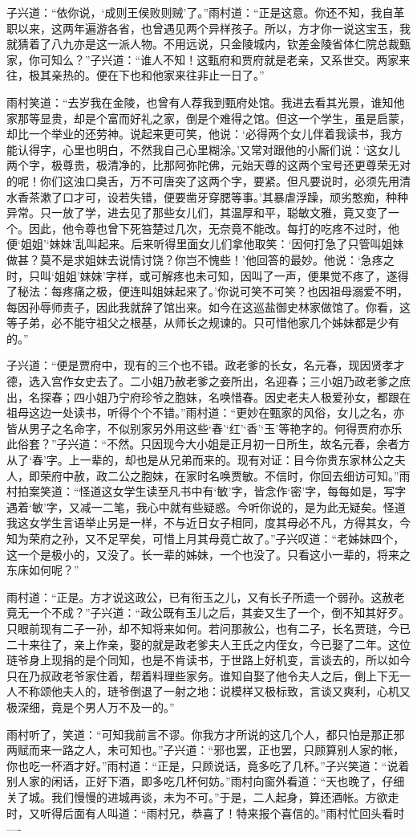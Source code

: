 子兴道：“依你说，‘成则王侯败则贼’了。”雨村道：“正是这意。你还不知，我自革职以来，这两年遍游各省，也曾遇见两个异样孩子。所以，方才你一说这宝玉，我就猜着了八九亦是这一派人物。不用远说，只金陵城内，钦差金陵省体仁院总裁甄家，你可知么？”子兴道：“谁人不知！这甄府和贾府就是老亲，又系世交。两家来往，极其亲热的。便在下也和他家来往非止一日了。”

雨村笑道：“去岁我在金陵，也曾有人荐我到甄府处馆。我进去看其光景，谁知他家那等显贵，却是个富而好礼之家，倒是个难得之馆。但这一个学生，虽是启蒙，却比一个举业的还劳神。说起来更可笑，他说：‘必得两个女儿伴着我读书，我方能认得字，心里也明白，不然我自己心里糊涂。’又常对跟他的小厮们说：‘这女儿两个字，极尊贵，极清净的，比那阿弥陀佛，元始天尊的这两个宝号还更尊荣无对的呢！你们这浊口臭舌，万不可唐突了这两个字，要紧。但凡要说时，必须先用清水香茶漱了口才可，设若失错，便要凿牙穿腮等事。’其暴虐浮躁，顽劣憨痴，种种异常。只一放了学，进去见了那些女儿们，其温厚和平，聪敏文雅，竟又变了一个。因此，他令尊也曾下死笞楚过几次，无奈竟不能改。每打的吃疼不过时，他便‘姐姐’‘妹妹’乱叫起来。后来听得里面女儿们拿他取笑：‘因何打急了只管叫姐妹做甚？莫不是求姐妹去说情讨饶？你岂不愧些！’他回答的最妙。他说：‘急疼之时，只叫‘姐姐’妹妹’字样，或可解疼也未可知，因叫了一声，便果觉不疼了，遂得了秘法：每疼痛之极，便连叫姐妹起来了。’你说可笑不可笑？也因祖母溺爱不明，每因孙辱师责子，因此我就辞了馆出来。如今在这巡盐御史林家做馆了。你看，这等子弟，必不能守祖父之根基，从师长之规谏的。只可惜他家几个姊妹都是少有的。”

子兴道：“便是贾府中，现有的三个也不错。政老爹的长女，名元春，现因贤孝才德，选入宫作女史去了。二小姐乃赦老爹之妾所出，名迎春；三小姐乃政老爹之庶出，名探春；四小姐乃宁府珍爷之胞妹，名唤惜春。因史老夫人极爱孙女，都跟在祖母这边一处读书，听得个个不错。”雨村道：“更妙在甄家的风俗，女儿之名，亦皆从男子之名命字，不似别家另外用这些‘春’‘红’‘香’‘玉’等艳字的。何得贾府亦乐此俗套？”子兴道：“不然。只因现今大小姐是正月初一日所生，故名元春，余者方从了‘春’字。上一辈的，却也是从兄弟而来的。现有对证：目今你贵东家林公之夫人，即荣府中赦，政二公之胞妹，在家时名唤贾敏。不信时，你回去细访可知。”雨村拍案笑道：“怪道这女学生读至凡书中有‘敏’字，皆念作‘密’字，每每如是，写字遇着‘敏’字，又减一二笔，我心中就有些疑惑。今听你说的，是为此无疑矣。怪道我这女学生言语举止另是一样，不与近日女子相同，度其母必不凡，方得其女，今知为荣府之孙，又不足罕矣，可惜上月其母竟亡故了。”子兴叹道：“老姊妹四个，这一个是极小的，又没了。长一辈的姊妹，一个也没了。只看这小一辈的，将来之东床如何呢？”

雨村道：“正是。方才说这政公，已有衔玉之儿，又有长子所遗一个弱孙。这赦老竟无一个不成？”子兴道：“政公既有玉儿之后，其妾又生了一个，倒不知其好歹。只眼前现有二子一孙，却不知将来如何。若问那赦公，也有二子，长名贾琏，今已二十来往了，亲上作亲，娶的就是政老爹夫人王氏之内侄女，今已娶了二年。这位琏爷身上现捐的是个同知，也是不肯读书，于世路上好机变，言谈去的，所以如今只在乃叔政老爷家住着，帮着料理些家务。谁知自娶了他令夫人之后，倒上下无一人不称颂他夫人的，琏爷倒退了一射之地：说模样又极标致，言谈又爽利，心机又极深细，竟是个男人万不及一的。”

雨村听了，笑道：“可知我前言不谬。你我方才所说的这几个人，都只怕是那正邪两赋而来一路之人，未可知也。”子兴道：“邪也罢，正也罢，只顾算别人家的帐，你也吃一杯酒才好。”雨村道：“正是，只顾说话，竟多吃了几杯。”子兴笑道：“说着别人家的闲话，正好下酒，即多吃几杯何妨。”雨村向窗外看道：“天也晚了，仔细关了城。我们慢慢的进城再谈，未为不可。”于是，二人起身，算还酒帐。方欲走时，又听得后面有人叫道：“雨村兄，恭喜了！特来报个喜信的。”雨村忙回头看时----